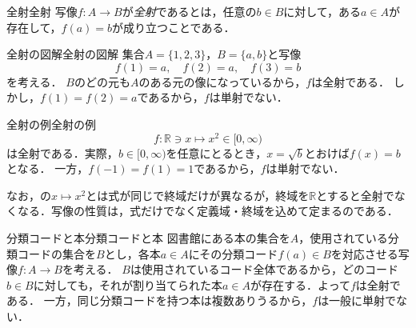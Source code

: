 \begin{definition}{全射}{全射}
  写像$f \colon A \to B$が\emph{全射}であるとは，任意の$b \in B$に対して，ある$a \in A$が存在して，$f(a) = b$が成り立つことである．
\end{definition}

\begin{example}[
    sidebyside,
    righthand width=\mnsc{6.2cm},
    sidebyside gap=\mnsc{4mm},
  ]{全射の図解}{全射の図解}
  集合$A = \{1, 2, 3\}$，$B = \{a, b\}$と写像
  \[
    f(1) = a, \quad f(2) = a, \quad f(3) = b
  \]
  を考える．
  $B$のどの元も$A$のある元の像になっているから，$f$は全射である．
  しかし，$f(1) = f(2) = a$であるから，$f$は単射でない．

  \tcblower

  \centering
\end{example}

\begin{example}{全射の例}{全射の例}
  \[
    f \colon \mathbb{R} \ni x \mapsto x^2 \in [0, \infty)
  \]
  は全射である．実際，$b \in [0, \infty)$を任意にとるとき，$x = \sqrt{b}$とおけば$f(x) = b$となる．
  一方，$f(-1) = f(1) = 1$であるから，$f$は単射でない．

  なお，の$x \mapsto x^2$とは式が同じで終域だけが異なるが，終域を$\mathbb{R}$とすると全射でなくなる．写像の性質は，式だけでなく定義域・終域を込めて定まるのである．
\end{example}

\begin{example}{分類コードと本}{分類コードと本}
  図書館にある本の集合を$A$，使用されている分類コードの集合を$B$とし，各本$a \in A$にその分類コード$f(a) \in B$を対応させる写像$f \colon A \to B$を考える．
  $B$は使用されているコード全体であるから，どのコード$b \in B$に対しても，それが割り当てられた本$a \in A$が存在する．よって$f$は全射である．
  一方，同じ分類コードを持つ本は複数ありうるから，$f$は一般に単射でない．
\end{example}


